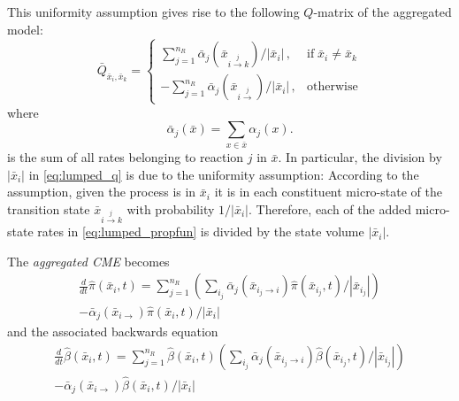 This uniformity assumption gives rise to the following $Q$-matrix of
the aggregated model:
\begin{equation}\label{eq:lumped_q}
  \bar{Q}_{ \bar{x}_i,  \bar{x}_k} =
  \begin{cases}
    \sum_{j=1}^{n_R}{\bar\alpha}_j\left(\bar{x}_{i\xrightarrow{j}k}\right)/\left|\bar{x}_i\right|\,,&\text{if}\;
    \bar{x}_i\neq \bar{x}_k\\[1ex]
    -\sum_{j=1}^{n_R}{\bar\alpha}_j\left(\bar{x}_{i\xrightarrow{j}}\right)/{\left|\bar{x}_i\right|}\,,
    &\text{otherwise}
  \end{cases}
\end{equation}
where
\begin{equation}\label{eq:lumped_propfun}
  \bar{\alpha}_j({\bar{x}}) = \sum_{x\in \bar{x}} \alpha_j(x).
\end{equation}
is the sum of all rates belonging to reaction $j$ in $\bar{x}$.
In particular, the division by $\left|\bar{x}_i\right|$ in
\eqref{eq:lumped_q} is due to the uniformity assumption: According to
the assumption, given the process is in $\bar{x}_i$ it is in
each constituent micro-state of the transition state
$\bar{x}_{i\xrightarrow{j} k}$ with probability $1/{\left|\bar{x}_i\right|}$.
Therefore, each of the added micro-state rates in
\eqref{eq:lumped_propfun} is divided
by the state volume $\left|\bar{x}_i\right|$.

The \emph{aggregated \ac{CME}} becomes
\begin{multline}\label{eq:lumped_cme}
  \frac{d}{dt}\hat{\pi}(\bar{x}_i, t) =
  \sum_{j=1}^{n_R}
  \left(\sum_{i_j}\bar{\alpha}_j(\bar{x}_{i_j \rightarrow
  i})\hat{\pi}(\bar{x}_{i_j}, t) / \left| \bar{x}_{i_j}\right|\right)\\
  - \bar{\alpha}_j(\bar{x}_{i\rightarrow})\hat{\pi}(\bar{x}_i, t) /
  \left| \bar{x}_i \right|
\end{multline}
and the associated backwards equation
\begin{multline}\label{eq:lumped_bcme}
  \frac{d}{dt}\hat{\beta}(\bar{x}_i, t) =
  \sum_{j=1}^{n_R}
  \hat{\beta}(\bar{x}_i, t)
  \left(\sum_{i_j}\bar{\alpha}_j(\bar{x}_{i_j \rightarrow
  i})\hat{\beta}(\bar{x}_{i_j}, t) / \left| \bar{x}_{i_j}\right|\right)\\
  - \bar{\alpha}_j(\bar{x}_{i\rightarrow})\hat{\beta}(\bar{x}_i, t) /
  \left| \bar{x}_i \right|
\end{multline}

